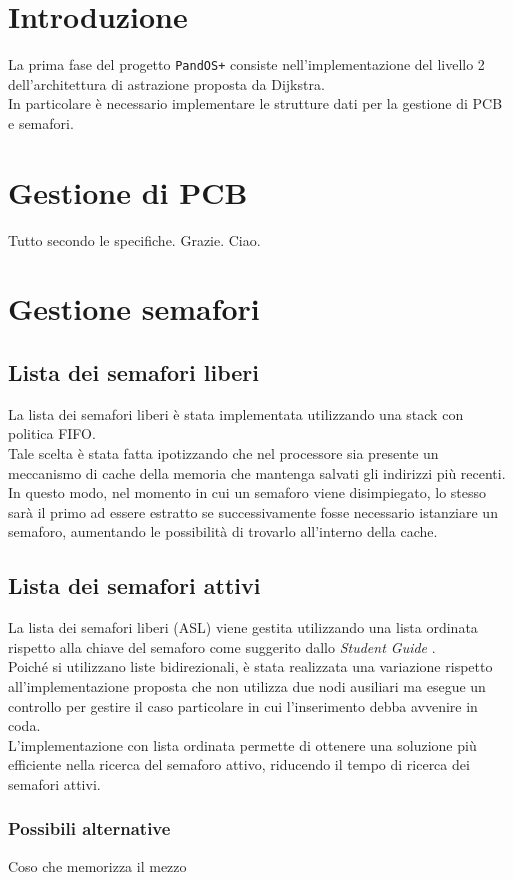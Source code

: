 \documentclass[11pt]{article}
\begin{document}
\newpage

\section{Introduzione}
La prima fase del progetto \texttt{PandOS+} consiste nell'implementazione del livello 2 dell'architettura di astrazione proposta da Dijkstra.\\
In particolare è necessario implementare le strutture dati per la gestione di PCB e semafori.

\section{Gestione di PCB}
Tutto secondo le specifiche. Grazie. Ciao.

\section{Gestione semafori}
\subsection{Lista dei semafori liberi}
La lista dei semafori liberi è stata implementata utilizzando una stack con politica FIFO. \\
Tale scelta è stata fatta ipotizzando che nel processore sia presente un meccanismo di cache della memoria che mantenga salvati gli indirizzi più recenti. 
In questo modo, nel momento in cui un semaforo viene disimpiegato, 
lo stesso sarà il primo ad essere estratto se successivamente fosse necessario istanziare un semaforo, aumentando le possibilità di trovarlo all'interno della cache.

\subsection{Lista dei semafori attivi}
La lista dei semafori liberi (ASL) viene gestita utilizzando una lista ordinata rispetto alla chiave del semaforo come suggerito dallo \textit{Student Guide} \cite{1}. \\
Poiché si utilizzano liste bidirezionali, è stata realizzata una variazione rispetto all'implementazione proposta che non utilizza due nodi ausiliari ma 
esegue un controllo per gestire il caso particolare in cui l'inserimento debba avvenire in coda.\\
L'implementazione con lista ordinata permette di ottenere una soluzione più efficiente nella ricerca del semaforo attivo, riducendo il tempo di ricerca dei semafori attivi.
\subsubsection{Possibili alternative}
Coso che memorizza il mezzo

\newpage
\printbibliography[title={Bibliografia}]
\end{document}
